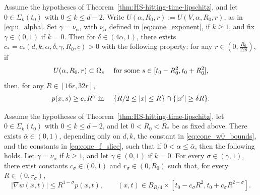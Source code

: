 \documentclass[10pt,a4paper]{amsart}
\begin{document}
\begin{lem}\label{lem:cone_pressure_away_spine}
Assume the hypotheses of Theorem~\ref{thm:HS-hitting-time-lipschitz}, and let
\(0\in\Sigma_k(t_0)\) with \(0\leq k\leq d-2\).
Write \(U(\alpha,R_0,r):=U(V,\alpha,R_0,r)\), as in \eqref{eq:u_alpha}. Set \(\gamma=\nu_\alpha\), with \(\nu_\alpha\) defined in \eqref{eq:cone_exponent}, if \(k\geq1\), and fix \(\gamma\in(0,1)\) if \(k=0\). Then for \(\delta\in(4\alpha,1)\), there exists $c_*=c_*(d,k,\alpha,\delta,\gamma,R_0, \underline c)>0$ with the following
property:  for any $r\in (0,\frac{R_0}{128})$, if 
\[
    U(\alpha,R_0,r)\subset\Omega_s \quad \hbox{ for some  }
s\in [t_0-R_0^2, t_0+R_0^2], \]
then, for any $R\in [16r, 32r]$, 
\begin{equation}\label{eq:cone_pressure_lower_away_spine}
    p(x,s)\geq c_*R^\gamma \hbox{ in } \quad \{R/2\leq |x|\leq R\}\cap \{|x'| \geq \delta R\}.
\end{equation}
\end{lem}

\begin{prop}\label{lem:cone_gradient_intrinsic_window}
Assume the hypotheses of Theorem~\ref{thm:HS-hitting-time-lipschitz}, let
\(0\in\Sigma_k(t_0)\) with \(0\leq k\leq d-2\), and let \(0<R_0<R_*\) be as fixed above.
There exists
\(\bar\alpha\in(0,1)\), depending only on \(d,k\), the constant in
\eqref{eq:cone_w0_bounds}, and the constants in \eqref{eq:cone_f_slice}, such
that if \(0<\alpha\leq\bar\alpha\), then the following holds.
Let \(\gamma=\nu_\alpha\) if \(k\geq1\), and let
\(\gamma\in(0,1)\) if \(k=0\).
For every \(\sigma\in(\gamma,1)\), there exist constants
\(c_\sigma\in(0,1)\) and \(r_\sigma\in(0,R_0)\) such that, for every \(R\in(0,r_\sigma)\),
\begin{equation}\label{eq:cone_gradient_intrinsic_window}
    |\nabla w(x,t)|\leq R^{1-\sigma} p(x,t),
    \qquad
    (x,t)\in B_{R/4}\times [t_0-c_\sigma R^2,t_0+c_\sigma R^{2-\sigma}].
\end{equation}
\end{prop}
\end{document}
